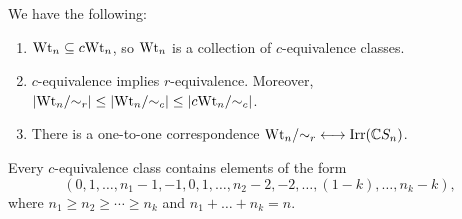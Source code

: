 \begin{corollary}
  We have the following:
  \begin{enumerate}
    \item $\operatorname{Wt}_n \subseteq c{\operatorname{Wt}_n}$, so
      $\operatorname{Wt}_n$ is a collection of
      $c$-equivalence classes.
    \item $c$-equivalence implies
      $r$-equivalence. Moreover,
      $|{\operatorname{Wt}_n} / {\sim_r}| \le |{\operatorname{Wt}_n} / {\sim_c}| \le |{c{\operatorname{Wt}_n}} / {\sim_c}|$.
    \item There is a one-to-one correspondence
      ${\operatorname{Wt}_n} / {\sim_r} \longleftrightarrow \operatorname{Irr}(\mathbb{C} S_n)$.
  \end{enumerate}
\end{corollary}

\begin{lemma}\label{lem:comb-weights}
  Every $c$-equivalence class contains
  elements of the form
  \[(0, 1, \dots, n_1 - 1, -1, 0, 1, \dots, n_2 - 2, -2, \dots, (1 - k), \dots, n_k - k),\]
  where $n_1 \ge n_2 \ge \cdots \ge n_k$
  and $n_1 + \dots + n_k = n$.
\end{lemma}

